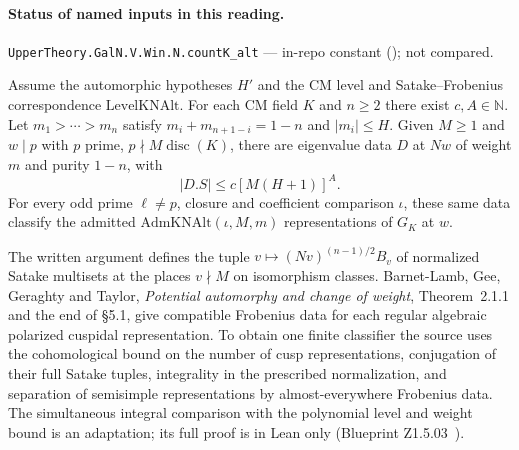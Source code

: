 

\paragraph{Status of named inputs in this reading.}
\noindent\nolinkurl{UpperTheory.GalN.V.Win.N.countK_alt} --- in-repo constant (); not compared.\par

\begin{formalstatement}\label{pn:P029}
Assume the automorphic hypotheses \(H'\) and the CM level and
Satake--Frobenius correspondence \(\mathrm{LevelKNAlt}\).
For each CM field \(K\) and \(n\ge2\) there exist \(c,A\in\mathbb N\).
Let \(m_1>\cdots>m_n\) satisfy \(m_i+m_{n+1-i}=1-n\)
and \(|m_i|\le H\). Given \(M\ge1\) and \(w\mid p\) with \(p\) prime,
\(p\nmid M\operatorname{disc}(K)\), there are eigenvalue data \(D\)
at \(Nw\) of weight \(m\) and purity \(1-n\), with
\[
 |D.S|\le c[M(H+1)]^A .
\]
For every odd prime \(\ell\ne p\), closure and coefficient comparison
\(\iota\), these same data classify the admitted
\(\mathrm{AdmKNAlt}(\iota,M,m)\) representations of \(G_K\) at \(w\).
\end{formalstatement}

The written argument defines the tuple \(v\mapsto (Nv)^{(n-1)/2}B_v\)
of normalized Satake multisets at the places \(v\nmid M\) on isomorphism
classes. Barnet-Lamb, Gee, Geraghty and Taylor, \emph{Potential automorphy
and change of weight}, Theorem~2.1.1 and the end of \S5.1, give
compatible Frobenius data for each regular algebraic polarized cuspidal
representation. To obtain one finite classifier the source uses the
cohomological bound on the number of cusp representations, conjugation
of their full Satake tuples, integrality in the prescribed normalization,
and separation of semisimple representations by almost-everywhere
Frobenius data. The simultaneous integral comparison with the polynomial
level and weight bound is an adaptation; its full proof is in Lean only
(Blueprint Z1.5.03~). \cite{r21-blggt}
